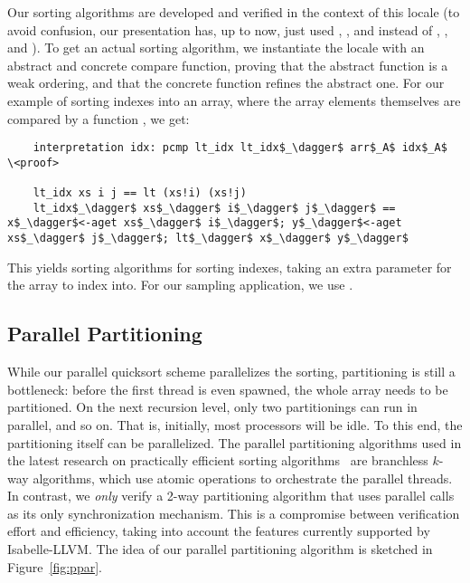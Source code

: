 \documentclass[sn-mathphys,Numbered]{sn-jnl}
\theoremstyle{thmstyleone}%
\theoremstyle{definition}%
\theoremstyle{thmstylethree}%
\begin{document}
  Our sorting algorithms are developed and verified in the context of this locale (to avoid confusion, our presentation has, up to now, just used \is{<}, \is{<=}, and  instead of , , and ).
  To get an actual sorting algorithm, we instantiate the locale with an abstract and concrete compare function, proving
  that the abstract function is a weak ordering, and that the concrete function refines the abstract one.
  For our example of sorting indexes into an array, where the array elements themselves are compared by a function , we get:
  \begin{lstlisting}
    interpretation idx: pcmp lt_idx lt_idx$_\dagger$ arr$_A$ idx$_A$   \<proof>

    lt_idx xs i j == lt (xs!i) (xs!j)
    lt_idx$_\dagger$ xs$_\dagger$ i$_\dagger$ j$_\dagger$ == x$_\dagger$<-aget xs$_\dagger$ i$_\dagger$; y$_\dagger$<-aget xs$_\dagger$ j$_\dagger$; lt$_\dagger$ x$_\dagger$ y$_\dagger$
  \end{lstlisting}
  This yields sorting algorithms for sorting indexes, taking an extra parameter for the array to index into.
  For our sampling application, we use .

  \subsection{Parallel Partitioning}\label{sec:ppar}
  While our parallel quicksort scheme parallelizes the sorting, partitioning is still a bottleneck:
  before the first thread is even spawned, the whole array needs to be partitioned. On the next recursion level,
  only two partitionings can run in parallel, and so on. That is, initially,
  most processors will be idle. To this end, the partitioning itself can be parallelized.
  The parallel partitioning algorithms used in the latest research on practically efficient sorting
  algorithms~\cite{AWFS22} are branchless $k$-way algorithms, which use atomic operations to orchestrate the parallel threads.
  In contrast, we \emph{only} verify a 2-way partitioning algorithm that uses parallel calls as its only synchronization mechanism.
  This is a compromise between verification effort and efficiency, taking into account the features currently supported by Isabelle-LLVM.
  The idea of our parallel partitioning algorithm is sketched in Figure~\ref{fig:ppar}.
\end{document}
